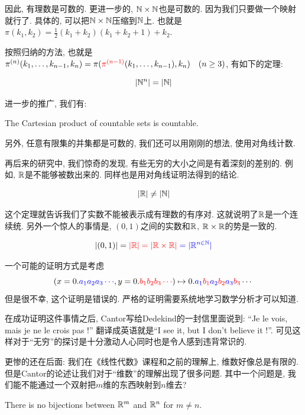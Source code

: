 因此, 有理数是可数的. 更进一步的, $\mathbb{N}\times \mathbb{N}$也是可数的. 因为我们只要做一个映射就行了. 具体的, 可以把$\mathbb{N} \times \mathbb{N} $压缩到$\mathbb{N}$上. 也就是$\pi(k_1, k_2) = \frac{1}{2} (k_1 + k_2)(k_1 + k_2 + 1) + k_2$. 

按照归纳的方法, 也就是$\pi^{(n)}(k_1, \ldots, k_{n-1}, k_n) = \pi (\textcolor{red}{\pi^{(n-1)}}(k_1, \ldots, k_{n-1}) , k_n)
\quad (n \ge 3)$, 有如下的定理: 
\begin{theorem}[$\N^{n}$ is Countable.]
  \[
    |\mathbb{N}^{n}| = |\mathbb{N}|
  \]
\end{theorem}

进一步的推广, 我们有:
\begin{theorem}
  The Cartesian product of  countable sets is countable.
\end{theorem}

另外, 任意有限集的并集都是可数的, 我们还可以用刚刚的想法, 使用对角线计数. 

再后来的研究中, 我们惊奇的发现, 有些无穷的大小之间是有着深刻的差别的. 例如, $\mathbb{R}$是不能够被数出来的. 同样也是用对角线证明法得到的结论. 

\begin{theorem}
  \[
    |\mathbb{R}| \neq |\mathbb{N}|
  \]
\end{theorem}

这个定理就告诉我们了实数不能被表示成有理数的有序对. 这就说明了$\mathbb{R}$是一个连续统. 另外一个惊人的事情是, $(0,1)$之间的实数和$\mathbb{R}$, $\mathbb{R}\times\mathbb{R}$的势是一致的. 
\begin{theorem}[$|\R|$ (Cantor 1877)]
    \[
      |(0,1)| = \textcolor{red}{|\mathbb{R}| = |\mathbb{R} \times \mathbb{R}|} \textcolor{blue}{\;= |\mathbb{R}^{n \in \mathbb{N}}|}
    \]
\end{theorem}
  
一个可能的证明方式是考虑
\[
    (x = 0.\textcolor{blue}{a_1 a_2 a_3 \cdots}, y = 0.\textcolor{red}{b_1 b_2 b_3 \cdots}) \mapsto 0.\textcolor{blue}{a_1}\textcolor{red}{b_1}\textcolor{blue}{a_2}\textcolor{red}{b_2}\textcolor{blue}{a_3}\textcolor{red}{b_3}\cdots
\]
但是很不幸, 这个证明是错误的. 严格的证明需要系统地学习数学分析才可以知道. 

在成功证明这件事情之后, Cantor写给Dedekind的一封信里面说到: ``Je le vois, mais je ne le crois pas !'' 翻译成英语就是``I see it, but I don’t believe it !''. 可见这样对于``无穷''的探讨是十分激动人心同时也是令人感到违背常识的. 

更惨的还在后面: 我们在《线性代数》课程和之前的理解上, 维数好像总是有限的. 但是Cantor的论述让我们对于``维数''的理解出现了很多问题. 其中一个问题是, 我们能不能通过一个双射把$m$维的东西映射到$n$维去? 

\begin{theorem}
    There is no  bijections between $\mathbb{R}^m$ and $\mathbb{R}^n$ for $m \neq n$.
\end{theorem}

